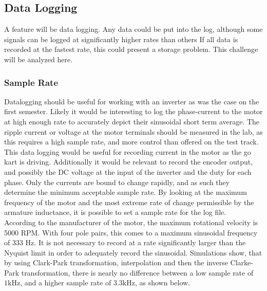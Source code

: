 \subsection{Data Logging}
A feature will be data logging. 
Any data could be put into the log, although some signals can be logged at significantly higher rates than others
If all data is recorded at the fastest rate, this could present a storage problem.
This challenge will be analyzed here.
\subsubsection{Sample Rate}

Datalogging should be useful for working with an inverter as was the case on the first semester.
Likely it would be interesting to log the phase-current to the motor at high enough rate to accurately depict their sinusoidal short term average.
The ripple current or voltage at the motor terminals should be measured in the lab, as this requires a high sample rate, and more control than offered on the test track.
This data logging would be useful for recording current in the motor as the go kart is driving.
Additionally it would be relevant to record the encoder output, and possibly the DC voltage at the input of the inverter and the duty for each phase.
Only the currents are bound to change rapidly, and as such they determine the minimum acceptable sample rate.
By looking at the maximum frequency of the motor and the most extreme rate of change permissible by the armature inductance, it is possible to set a sample rate for the log file.\\

According to the manufacturer of the motor, the maximum rotational velocity is 5000 RPM.
With four pole pairs, this comes to a maximum sinusoidal frequency of 333 Hz. 
It is not necessary to record at a rate significantly larger than the Nyquist limit in order to adequately record the sinusoidal.
Simulations show, that by using Clark-Park transformation, interpolation and then the inverse Clarke-Park transformation, there is nearly no difference between a low sample rate of $1\si{\kilo\hertz}$, and a higher sample rate of $3.3\si{\kilo\hertz}$, as shown below.

